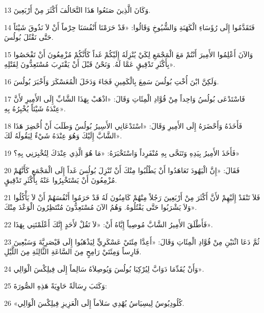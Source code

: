\par 13 وَكَانَ الَّذِينَ صَنَعُوا هَذَا التَّحَالُفَ أَكْثَرَ مِنْ أَرْبَعِينَ.
\par 14 فَتَقَدَّمُوا إِلَى رُؤَسَاءِ الْكَهَنَةِ وَالشُّيُوخِ وَقَالُوا: «قَدْ حَرَمْنَا أَنْفُسَنَا حِرْماً أَنْ لاَ نَذُوقَ شَيْئاً حَتَّى نَقْتُلَ بُولُسَ.
\par 15 وَالآنَ أَعْلِمُوا الأَمِيرَ أَنْتُمْ مَعَ الْمَجْمَعِ لِكَيْ يُنْزِلَهُ إِلَيْكُمْ غَداً كَأَنَّكُمْ مُزْمِعُونَ أَنْ تَفْحَصُوا بِأَكْثَرِ تَدْقِيقٍ عَمَّا لَهُ. وَنَحْنُ قَبْلَ أَنْ يَقْتَرِبَ مُسْتَعِدُّونَ لِقَتْلِهِ».
\par 16 وَلَكِنَّ ابْنَ أُخْتِ بُولُسَ سَمِعَ بِالْكَمِينِ فَجَاءَ وَدَخَلَ الْمُعَسْكَرَ وَأَخْبَرَ بُولُسَ.
\par 17 فَاسْتَدْعَى بُولُسُ وَاحِداً مِنْ قُوَّادِ الْمِئَاتِ وَقَالَ: «اذْهَبْ بِهَذَا الشَّابِّ إِلَى الأَمِيرِ لأَنَّ عِنْدَهُ شَيْئاً يُخْبِرُهُ بِهِ».
\par 18 فَأَخَذَهُ وَأَحْضَرَهُ إِلَى الأَمِيرِ وَقَالَ: «اسْتَدْعَانِي الأَسِيرُ بُولُسُ وَطَلَبَ أَنْ أُحْضِرَ هَذَا الشَّابَّ إِلَيْكَ وَهُوَ عِنْدَهُ شَيْءٌ لِيَقُولَهُ لَكَ».
\par 19 فَأَخَذَ الأَمِيرُ بِيَدِهِ وَتَنَحَّى بِهِ مُنْفَرِداً وَاسْتَخْبَرَهُ: «مَا هُوَ الَّذِي عِنْدَكَ لِتُخْبِرَنِي بِهِ؟»
\par 20 فَقَالَ: «إِنَّ الْيَهُودَ تَعَاهَدُوا أَنْ يَطْلُبُوا مِنْكَ أَنْ تُنْزِلَ بُولُسَ غَداً إِلَى الْمَجْمَعِ كَأَنَّهُمْ مُزْمِعُونَ أَنْ يَسْتَخْبِرُوا عَنْهُ بِأَكْثَرِ تَدْقِيقٍ.
\par 21 فَلاَ تَنْقَدْ إِلَيْهِمْ لأَنَّ أَكْثَرَ مِنْ أَرْبَعِينَ رَجُلاً مِنْهُمْ كَامِنُونَ لَهُ قَدْ حَرَمُوا أَنْفُسَهُمْ أَنْ لاَ يَأْكُلُوا وَلاَ يَشْرَبُوا حَتَّى يَقْتُلُوهُ. وَهُمُ الآنَ مُسْتَعِدُّونَ مُنْتَظِرُونَ الْوَعْدَ مِنْكَ».
\par 22 فَأَطْلَقَ الأَمِيرُ الشَّابَّ مُوصِياً إِيَّاهُ أَنْ: «لاَ تَقُلْ لأَحَدٍ إِنَّكَ أَعْلَمْتَنِي بِهَذَا».
\par 23 ثُمَّ دَعَا اثْنَيْنِ مِنْ قُوَّادِ الْمِئَاتِ وَقَالَ: «أَعِدَّا مِئَتَيْ عَسْكَرِيٍّ لِيَذْهَبُوا إِلَى قَيْصَرِيَّةَ وَسَبْعِينَ فَارِساً وَمِئَتَيْ رَامِحٍ مِنَ السَّاعَةِ الثَّالِثَةِ مِنَ اللَّيْلِ.
\par 24 وَأَنْ يُقَدِّمَا دَوَابَّ لِيُرْكِبَا بُولُسَ وَيُوصِلاَهُ سَالِماً إِلَى فِيلِكْسَ الْوَالِي».
\par 25 وَكَتَبَ رِسَالَةً حَاوِيَةً هَذِهِ الصُّورَةَ:
\par 26 «كُلُودِيُوسُ لِيسِيَاسُ يُهْدِي سَلاَماً إِلَى الْعَزِيزِ فِيلِكْسَ الْوَالِي.
